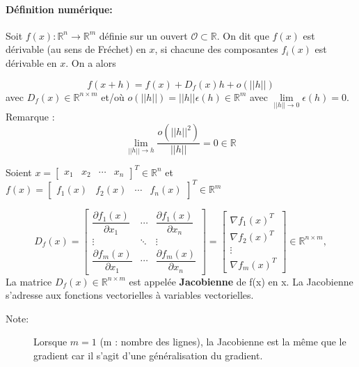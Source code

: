 	\paragraph*{Définition numérique:}
	
	Soit $f(x) : \mathbb{R}^n \to \mathbb{R}^m$ définie sur un ouvert $ \mathcal{O} \subset \mathbb{R} $. On dit que $f(x)$ est dérivable
	(au sens de Fréchet) en $x$, si chacune des composantes $f_i(x)$ est dérivable  en $x$. On a alors
	
	\begin{equation}
		f(x + h) = f(x) + D_f (x)h + o(||h||)
	\end{equation}
	avec $D_f (x) \in  \mathbb{R}^{n \times m} $ et/où $ o(||h||)=||h|| \epsilon(h) \in \mathbb{R}^m $ avec $\lim\limits_{||h|| \to 0} \epsilon(h) = 0 $.
	Remarque :
	$$
		\lim\limits_{||h|| \to h} \frac{o(||h||^2)}{||h||} = 0  \in \mathbb{R}
	$$
	
	Soient 
	$x = 
		\begin{bmatrix}
			x_1 & x_2& \cdots & x_n
		\end{bmatrix}^{T}
		\in \mathbb{R}^n $ et $ 
	f(x) = 
		\begin{bmatrix}
			f_1(x) & f_2(x)& \cdots & f_n(x)
		\end{bmatrix}^{T} \in \mathbb{R}^m
	$
	
	$$
	D_f\left(x\right)={
		\begin{bmatrix}
		{\dfrac {\partial f_{1}(x)}{\partial x_{1}}}&\cdots &{\dfrac {\partial f_{1}(x)}{\partial x_{n}}}\\
		\vdots &\ddots &\vdots \\
		{\dfrac {\partial f_{m}(x)}{\partial x_{1}}}&\cdots &{\dfrac {\partial f_{m}(x)}{\partial x_{n}}}
		\end{bmatrix}}
		=
		\begin{bmatrix}
		\nabla f_1(x)^T \\ \nabla f_2(x)^T\\ \vdots \\ \nabla f_m(x)^T
		\end{bmatrix}
		\in  \mathbb{R}^{n \times m},
	$$
	La matrice $D_f (x) \in  \mathbb{R}^{n \times m} $ est appelée \textbf{Jacobienne} de f(x) en x.
	La Jacobienne s’adresse aux fonctions vectorielles à variables vectorielles.
	
	
	
		
		
	\begin{description}
		\item[Note:] Lorsque $m=1$ (m : nombre des lignes), la Jacobienne est la même que le gradient car il s'agit d'une généralisation du gradient.
	\end{description}
	
